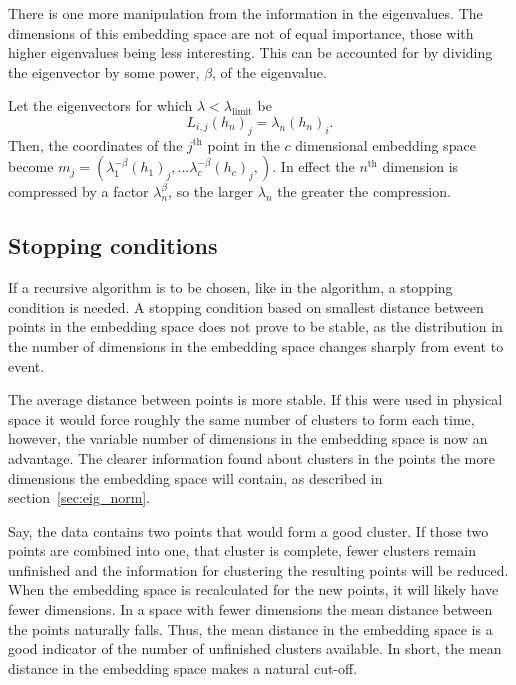 There is one more manipulation from the information in the eigenvalues.
The dimensions of this embedding space are not of equal importance,
those with higher eigenvalues being less interesting.
This can be accounted for by dividing the eigenvector by some power, \(\beta\), of the eigenvalue.

Let the eigenvectors for which \(\lambda < \lambda_\text{limit}\) be
\begin{equation}
    L_{i, j} (h_n)_j = \lambda_n (h_n)_i.
\end{equation}
Then, the coordinates of the \(j^\text{th}\) point in the \(c\) dimensional embedding space
become \(m_j = \left(\lambda_1^{-\beta} (h_1)_j, \dots \lambda_c^{-\beta} (h_c)_j,\right)\).
In effect the \(n^\text{th}\) dimension is compressed by a factor \(\lambda_n^\beta\),
so the larger \(\lambda_n\) the greater the compression.

\subsection{Stopping conditions}\label{sec:stopping_condintion}

If a recursive algorithm is to be chosen, like in the \genkt{} algorithm, a stopping condition is needed.
A stopping condition based on smallest distance between points in the embedding space does not prove to be stable,
as the distribution  in the number of dimensions in the embedding space changes sharply from event to event.

The average distance between points is more stable.
If this were used in physical space it would force roughly the same number of clusters to form each time,
however, the variable number of dimensions in the embedding space is now an advantage.
The  clearer information found about clusters in the points the more dimensions the embedding space will contain,
as described in section~\ref{sec:eig_norm}.

Say, the data contains two points that would form a good cluster.
If those two points are combined into one, that cluster is complete,
fewer clusters remain unfinished
and the information for clustering the resulting points will be reduced.
When the embedding space is recalculated for the new points, it will likely have fewer dimensions.
In a space with fewer dimensions the mean distance between the points naturally falls.
Thus, the mean distance in the embedding space is a good indicator of the number of unfinished clusters available.
In short, the mean distance in the embedding space makes a natural cut-off.
